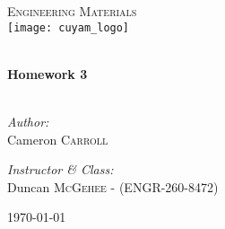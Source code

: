 \begin{titlepage}
\begin{center}

\textsc{\Large Engineering Materials}\\[0.5cm]
\texttt{[image: cuyam\_logo]}

\HRule \\[0.4cm]
{ \LARGE \bfseries Homework 3}\\[0.5cm]

\HRule \\[1.5cm]

\begin{minipage}{0.4\textwidth}
\begin{flushleft} \large
\emph{Author:}\\
Cameron \textsc{Carroll}
\end{flushleft}
\end{minipage}
\begin{minipage}{0.4\textwidth}
\begin{flushright} \large
\emph{Instructor \& Class:}\\
Duncan \textsc{McGehee} - (ENGR-260-8472)
\end{flushright}
\end{minipage}

\vfill

{\large \today}

\end{center}
\end{titlepage}